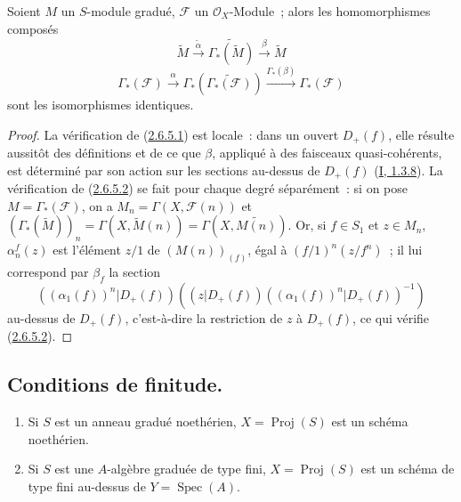 \begin{proposition}[2.6.5]
\label{II.2.6.5-fr}
Soient $M$ un $S$-module gradué, $\mathcal{F}$ un $\mathcal{O}_X$-Module~;
alors les homomorphismes composés
\[
\label{II.2.6.5.1-fr}
  \widetilde{M}\xrightarrow{\widetilde{\alpha}}
  \widetilde{\Gamma_*(\widetilde{M})}
  \xrightarrow{\beta}\widetilde{M}
\tag{2.6.5.1}
\]
\[
\label{II.2.6.5.2-fr}
  \Gamma_*(\mathcal{F})\xrightarrow{\alpha}
  \Gamma_*(\widetilde{\Gamma_*(\mathcal{F})})
  \xrightarrow{\Gamma_*(\beta)}\Gamma_*(\mathcal{F})
\tag{2.6.5.2}
\]
sont les isomorphismes identiques.
\end{proposition}

\begin{proof}
La vérification de (\hyperref[II.2.6.5.1-fr]{2.6.5.1}) est locale~: dans un
ouvert $D_+(f)$, elle résulte aussitôt des définitions et de ce que $\beta$,
appliqué à des faisceaux quasi-cohérents, est déterminé par son action sur les
sections au-dessus de $D_+(f)$ (\hyperref[I.1.3.8-fr]{I, 1.3.8}). La
vérification de (\hyperref[II.2.6.5.2-fr]{2.6.5.2}) se fait pour chaque degré
séparément~: si on pose $M=\Gamma_*(\mathcal{F})$, on a
$M_n=\Gamma(X,\mathcal{F}(n))$ et
$(\Gamma_*(\widetilde{M}))_n=\Gamma(X,\widetilde{M}(n))
=\Gamma(X,\widetilde{M(n)})$. Or, si $f\in S_1$ et $z\in M_n$,
$\alpha_n^f(z)$ est l'élément $z/1$ de $(M(n))_{(f)}$, égal à
$(f/1)^n(z/f^n)$~; il lui correspond par $\beta_f$ la section
\[
  ((\alpha_1(f))^n|D_+(f))
  ((z|D_+(f))((\alpha_1(f))^n|D_+(f))^{-1})
\]
au-dessus de $D_+(f)$, c'est-à-dire la restriction de $z$ à $D_+(f)$, ce qui
vérifie (\hyperref[II.2.6.5.2-fr]{2.6.5.2}).
\end{proof}

\subsection{Conditions de finitude.}
\label{subsection:II.2.7-fr}

\begin{proposition}[2.7.1]
\label{II.2.7.1-fr}
\begin{enumerate}
  \item[\rm(i)] Si $S$ est un anneau gradué noethérien,
    $X=\operatorname{Proj}(S)$ est un schéma noethérien.
  \item[\rm(ii)] Si $S$ est une $A$-algèbre graduée de type fini,
    $X=\operatorname{Proj}(S)$ est un schéma de type fini au-dessus de
    $Y=\operatorname{Spec}(A)$.
\end{enumerate}
\end{proposition}

